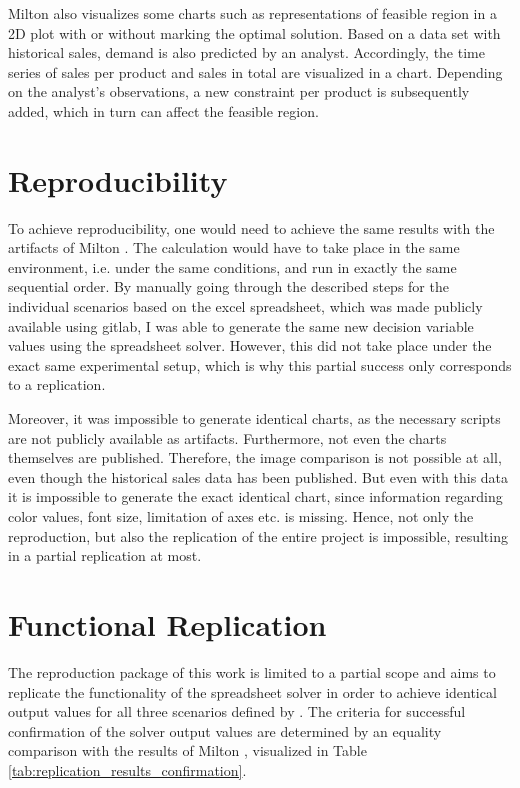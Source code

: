 \documentclass[sigconf, nonacm]{acmart}
\begin{document}
Milton \cite{Milton2009} also visualizes some charts such as representations of feasible region in a 2D plot with or without marking the optimal solution. Based on a data set with historical sales, demand is also predicted by an analyst. Accordingly, the time series of sales per product and sales in total are visualized in a chart. Depending on the analyst's observations, a new constraint per product is subsequently added, which in turn can affect the feasible region.



\section{Reproducibility}
To achieve reproducibility, one would need to achieve the same results with the artifacts of Milton \cite{Milton2009}. The calculation would have to take place in the same environment, i.e. under the same conditions, and run in exactly the same sequential order. By manually going through the described steps for the individual scenarios based on the excel spreadsheet, which was made publicly available using gitlab, I was able to generate the same new decision variable values using the spreadsheet solver. However, this did not take place under the exact same experimental setup, which is why this partial success only corresponds to a replication.


Moreover, it was impossible to generate identical charts, as the necessary scripts are not publicly available as artifacts. Furthermore, not even the charts themselves are published. Therefore, the image comparison is not possible at all, even though the historical sales data has been published. But even with this data it is impossible to generate the exact identical chart, since information regarding color values, font size, limitation of axes etc. is missing. Hence, not only the reproduction, but also the replication of the entire project is impossible, resulting in a partial replication at most.

\section{Functional Replication}
The reproduction package of this work is limited to a partial scope and aims to replicate the functionality of the spreadsheet solver in order to achieve identical output values for all three scenarios defined by \cite{Milton2009}. The criteria for successful confirmation of the solver output values are determined by an equality comparison with the results of Milton \cite{Milton2009}, visualized in Table \ref{tab:replication_results_confirmation}.
\end{document}
